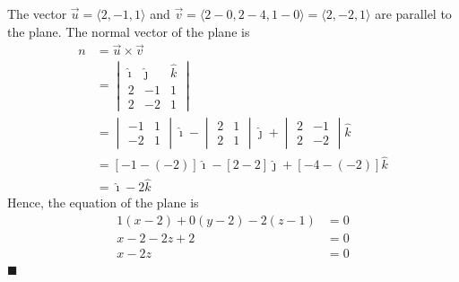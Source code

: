 \begin{enumerate}
          \sol{} The vector $\vec{u} = \langle 2, -1, 1 \rangle$ and $\vec{v} = \langle 2 - 0, 2 - 4, 1 - 0 \rangle = \langle 2, -2, 1 \rangle$ are parallel to the plane. The normal vector of the plane is
          \begin{align*}
              n & = \vec{u} \times \vec{v}                                                       \\
                & = \begin{vmatrix}
                        \hat{\imath} & \hat{\jmath} & \hat{k} \\
                        2            & -1           & 1       \\
                        2            & -2           & 1
                    \end{vmatrix}                    \\
                & = \begin{vmatrix}
                        -1 & 1 \\
                        -2 & 1
                    \end{vmatrix}\hat{\imath} - \begin{vmatrix}
                                                    2 & 1 \\
                                                    2 & 1
                                                \end{vmatrix}\hat{\jmath} + \begin{vmatrix}
                                                                                2 & -1 \\
                                                                                2 & -2
                                                                            \end{vmatrix}\hat{k} \\
                & = [-1 - (-2)]\hat{\imath} - [2 - 2]\hat{\jmath} + [-4 - (-2)]\hat{k}           \\
                & = \hat{\imath} - 2\hat{k}
          \end{align*}
          Hence, the equation of the plane is
          \begin{align*}
              1(x - 2) + 0(y - 2) - 2(z - 1) & = 0 \\
              x - 2 - 2z + 2                 & = 0 \\
              x - 2z                         & = 0
          \end{align*} \hfill $\blacksquare$

\end{enumerate}
